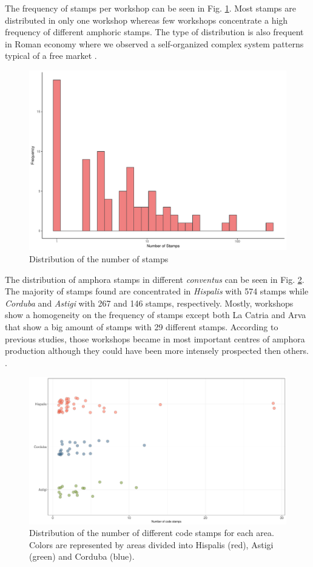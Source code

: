 \documentclass[review]{elsarticle}
\begin{document}
The frequency of stamps per workshop can be seen in Fig. \ref{stamps}. Most stamps are distributed in only one workshop whereas few workshops concentrate a high frequency of different amphoric stamps. The type of distribution is also frequent in Roman economy where we observed a self-organized complex system patterns typical of a free market \citep{bayesian_2018}. 


\begin{figure}[htp]
	\centering
\includegraphics[width=\linewidth]{figs/frequencystamp.pdf}
\caption{Distribution of the number of stamps}
\label{stamps}
\end{figure} 


The distribution of amphora stamps in different \textit{conventus} can be seen in Fig. \ref{frequency}. The majority of stamps found are concentrated in \textit{Hispalis} with 574 stamps while \textit{Corduba} and \textit{Astigi} with 267 and 146 stamps, respectively. Mostly, workshops show a homogeneity on the frequency of stamps except both La Catria and Arva that show a big amount of stamps with 29 different stamps. According to previous studies, those workshops became in most important centres of amphora production although they could have been more intensely prospected then others. \citep{arva_1997}.
 
\begin{figure}[htp]
	\centering
\includegraphics[width=\linewidth]{figs/frequency}
\caption{Distribution of the number of different code stamps for each area. Colors are represented by areas divided into Hispalis (red), Astigi (green) and Corduba (blue).}
\label{frequency}
\end{figure} 
\end{document}

